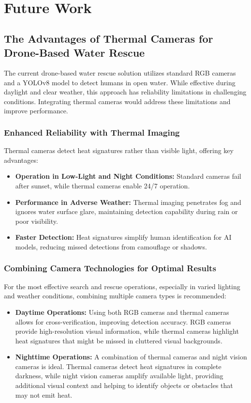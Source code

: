 \section{Future Work}

\subsection{The Advantages of Thermal Cameras for Drone-Based Water Rescue}

The current drone-based water rescue solution utilizes standard RGB cameras and a YOLOv8 model to detect humans in open water. While effective during daylight and clear weather, this approach has reliability limitations in challenging conditions. Integrating thermal cameras would address these limitations and improve performance.

\subsubsection{Enhanced Reliability with Thermal Imaging}

Thermal cameras detect heat signatures rather than visible light, offering key advantages:

\begin{itemize}
    \item \textbf{Operation in Low-Light and Night Conditions:} Standard cameras fail after sunset, while thermal cameras enable 24/7 operation\cite{advexure_thermal_sar}.
    \item \textbf{Performance in Adverse Weather:} Thermal imaging penetrates fog and ignores water surface glare, maintaining detection capability during rain or poor visibility.
    \item \textbf{Faster Detection:} Heat signatures simplify human identification for AI models, reducing missed detections from camouflage or shadows.
\end{itemize}

\subsubsection{Combining Camera Technologies for Optimal Results}

For the most effective search and rescue operations, especially in varied lighting and weather conditions, combining multiple camera types is recommended:

\begin{itemize}
    \item \textbf{Daytime Operations:} Using both RGB cameras and thermal cameras allows for cross-verification, improving detection accuracy. RGB cameras provide high-resolution visual information, while thermal cameras highlight heat signatures that might be missed in cluttered visual backgrounds.
    \item \textbf{Nighttime Operations:} A combination of thermal cameras and night vision cameras is ideal. Thermal cameras detect heat signatures in complete darkness, while night vision cameras amplify available light, providing additional visual context and helping to identify objects or obstacles that may not emit heat.
\end{itemize}

